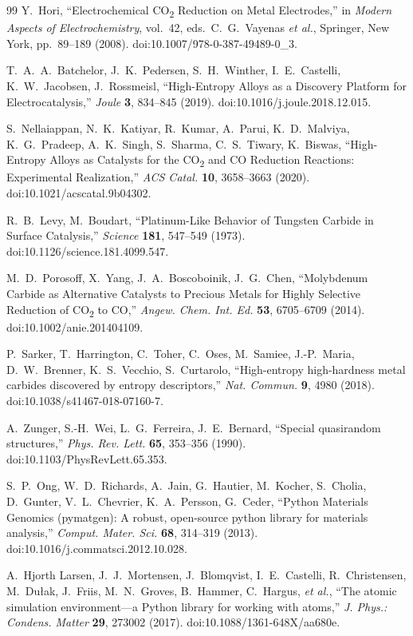 \documentclass[11pt,a4paper]{report}
\begin{document}
\begin{thebibliography}{99}
 Y.~Hori, ``Electrochemical CO\textsubscript{2} Reduction on Metal Electrodes,''
in \emph{Modern Aspects of Electrochemistry}, vol.~42, eds.\ C.~G.~Vayenas \emph{et al.},
Springer, New York, pp.~89--189 (2008). doi:10.1007/978-0-387-49489-0\_3.

 T.~A.~A.~Batchelor, J.~K.~Pedersen, S.~H.~Winther, I.~E.~Castelli,
K.~W.~Jacobsen, J.~Rossmeisl,
``High-Entropy Alloys as a Discovery Platform for Electrocatalysis,''
\emph{Joule} \textbf{3}, 834--845 (2019). doi:10.1016/j.joule.2018.12.015.

 S.~Nellaiappan, N.~K.~Katiyar, R.~Kumar, A.~Parui, K.~D.~Malviya,
K.~G.~Pradeep, A.~K.~Singh, S.~Sharma, C.~S.~Tiwary, K.~Biswas,
``High-Entropy Alloys as Catalysts for the CO\textsubscript{2} and CO Reduction Reactions:
Experimental Realization,'' \emph{ACS Catal.} \textbf{10}, 3658--3663 (2020).
doi:10.1021/acscatal.9b04302.

 R.~B.~Levy, M.~Boudart,
``Platinum-Like Behavior of Tungsten Carbide in Surface Catalysis,''
\emph{Science} \textbf{181}, 547--549 (1973). doi:10.1126/science.181.4099.547.

 M.~D.~Porosoff, X.~Yang, J.~A.~Boscoboinik, J.~G.~Chen,
``Molybdenum Carbide as Alternative Catalysts to Precious Metals for Highly Selective Reduction of
CO\textsubscript{2} to CO,'' \emph{Angew. Chem. Int. Ed.} \textbf{53}, 6705--6709 (2014).
doi:10.1002/anie.201404109.

 P.~Sarker, T.~Harrington, C.~Toher, C.~Oses, M.~Samiee, J.-P.~Maria,
D.~W.~Brenner, K.~S.~Vecchio, S.~Curtarolo,
``High-entropy high-hardness metal carbides discovered by entropy descriptors,''
\emph{Nat. Commun.} \textbf{9}, 4980 (2018). doi:10.1038/s41467-018-07160-7.

 A.~Zunger, S.-H.~Wei, L.~G.~Ferreira, J.~E.~Bernard,
``Special quasirandom structures,'' \emph{Phys. Rev. Lett.} \textbf{65}, 353--356 (1990).
doi:10.1103/PhysRevLett.65.353.

 S.~P.~Ong, W.~D.~Richards, A.~Jain, G.~Hautier, M.~Kocher, S.~Cholia,
D.~Gunter, V.~L.~Chevrier, K.~A.~Persson, G.~Ceder,
``Python Materials Genomics (pymatgen): A robust, open-source python library for materials
analysis,'' \emph{Comput. Mater. Sci.} \textbf{68}, 314--319 (2013).
doi:10.1016/j.commatsci.2012.10.028.

 A.~Hjorth Larsen, J.~J.~Mortensen, J.~Blomqvist, I.~E.~Castelli, R.~Christensen,
M.~Du\l{}ak, J.~Friis, M.~N.~Groves, B.~Hammer, C.~Hargus, \emph{et al.},
``The atomic simulation environment---a Python library for working with atoms,''
\emph{J. Phys.: Condens. Matter} \textbf{29}, 273002 (2017). doi:10.1088/1361-648X/aa680e.

\end{thebibliography}
\end{document}
